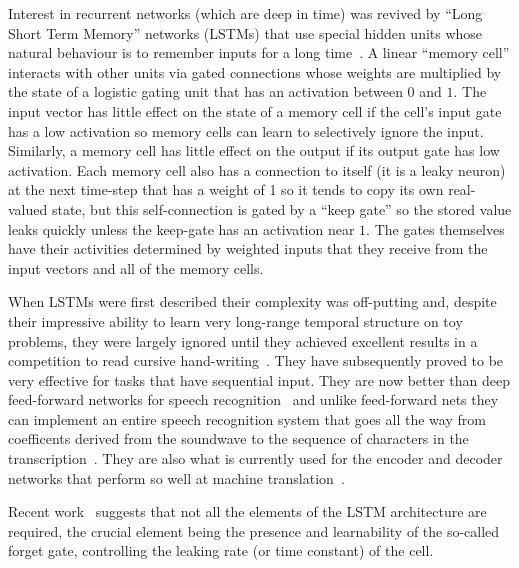 \documentclass[]{article}
\begin{document}
Interest in recurrent networks (which are deep in time) was revived by
``Long Short Term Memory'' networks (LSTMs) that use special hidden units
whose natural behaviour is to remember inputs for a long
time~\citep{Hochreiter+Schmidhuber-1997}.  
A linear ``memory cell'' interacts with other units
via gated connections whose weights are multiplied by the state of a
logistic gating unit that has an activation between $0$ and $1$. The input
vector has little effect on the state of a memory cell if the cell's input
gate has a low activation so memory cells can learn to selectively ignore
the input.  Similarly, a memory cell has little effect on the output if its
output gate has low activation. Each memory cell also has a connection to
itself (it is a leaky neuron) at the next time-step that has a weight of 1 so it tends to copy its
own real-valued state, but this self-connection is gated by a ``keep gate'' so
the stored value leaks quickly unless the keep-gate has an activation
near $1$.  The gates themselves have their activities determined by
weighted inputs that they receive from the input vectors and all of the
memory cells.

When LSTMs were first described %
\citep{Hochreiter+Schmidhuber-1997} their complexity was off-putting
and, despite their impressive ability to learn very long-range temporal
structure on toy problems, they were largely ignored until they achieved
excellent results in a competition to read cursive
hand-writing~\citep{Graves-et-al-2009}. They have subsequently proved to be very
effective for tasks that have sequential input.  They are now better than
deep feed-forward networks for speech recognition~\citep{gravestimit} and
unlike feed-forward nets they can implement an entire speech recognition
system that goes all the way from coefficents derived from the soundwave to
the sequence of characters in the transcription~\citep{gravestimit}.  They
are also what is currently used for the encoder and decoder networks that
perform so well at machine
translation~\citep{Bahdanau-et-al-arxiv2014,Sutskever-et-al-NIPS2014}.

Recent work~\citep{Chung-et-al-NIPSDL2014,Yao-et-al-SLU-workshop2014} 
suggests that not all the elements of the LSTM
architecture are required, the crucial element being the presence and learnability 
of the so-called forget gate, controlling the leaking rate (or time constant) of the cell.
\end{document}
